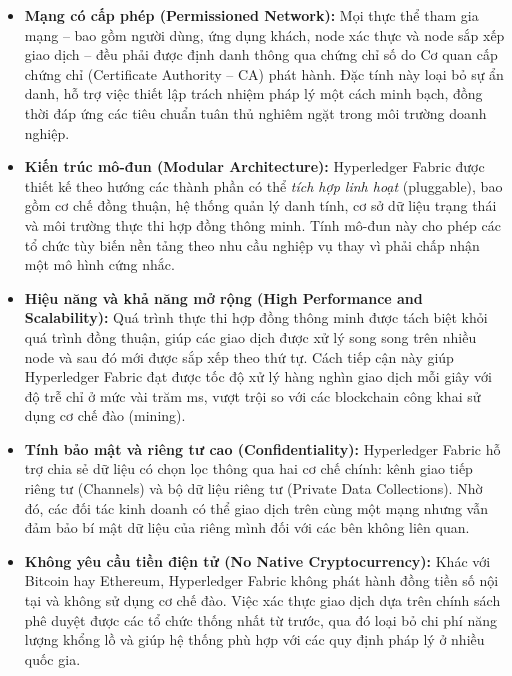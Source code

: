 \begin{itemize}
    \item \textbf{Mạng có cấp phép (Permissioned Network):} Mọi thực thể tham gia mạng -- bao gồm người dùng, ứng dụng khách, node xác thực và node sắp xếp giao dịch -- đều phải được định danh thông qua chứng chỉ số do Cơ quan cấp chứng chỉ (Certificate Authority -- CA) phát hành. Đặc tính này loại bỏ sự ẩn danh, hỗ trợ việc thiết lập trách nhiệm pháp lý một cách minh bạch, đồng thời đáp ứng các tiêu chuẩn tuân thủ nghiêm ngặt trong môi trường doanh nghiệp.

    \item \textbf{Kiến trúc mô-đun (Modular Architecture):} Hyperledger Fabric được thiết kế theo hướng các thành phần có thể \textit{tích hợp linh hoạt} (pluggable), bao gồm cơ chế đồng thuận, hệ thống quản lý danh tính, cơ sở dữ liệu trạng thái và môi trường thực thi hợp đồng thông minh. Tính mô-đun này cho phép các tổ chức tùy biến nền tảng theo nhu cầu nghiệp vụ thay vì phải chấp nhận một mô hình cứng nhắc.

    \item \textbf{Hiệu năng và khả năng mở rộng (High Performance and Scalability):} Quá trình thực thi hợp đồng thông minh được tách biệt khỏi quá trình đồng thuận, giúp các giao dịch được xử lý song song trên nhiều node và sau đó mới được sắp xếp theo thứ tự. Cách tiếp cận này giúp Hyperledger Fabric đạt được tốc độ xử lý hàng nghìn giao dịch mỗi giây với độ trễ chỉ ở mức vài trăm ms, vượt trội so với các blockchain công khai sử dụng cơ chế đào (mining).

    \item \textbf{Tính bảo mật và riêng tư cao (Confidentiality):} Hyperledger Fabric hỗ trợ chia sẻ dữ liệu có chọn lọc thông qua hai cơ chế chính: kênh giao tiếp riêng tư (Channels) và bộ dữ liệu riêng tư (Private Data Collections). Nhờ đó, các đối tác kinh doanh có thể giao dịch trên cùng một mạng nhưng vẫn đảm bảo bí mật dữ liệu của riêng mình đối với các bên không liên quan.

    \item \textbf{Không yêu cầu tiền điện tử (No Native Cryptocurrency):} Khác với Bitcoin hay Ethereum, Hyperledger Fabric không phát hành đồng tiền số nội tại và không sử dụng cơ chế đào. Việc xác thực giao dịch dựa trên chính sách phê duyệt được các tổ chức thống nhất từ trước, qua đó loại bỏ chi phí năng lượng khổng lồ và giúp hệ thống phù hợp với các quy định pháp lý ở nhiều quốc gia.
\end{itemize}

